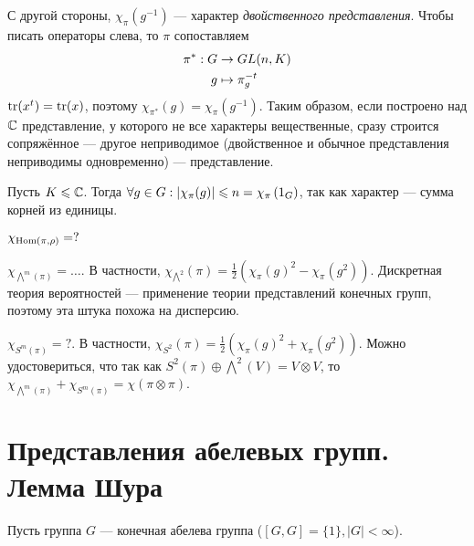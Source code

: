 {    С другой стороны, $\chi_{\pi}(g^{-1})$ --- характер \emph{двойственного представления}.
    Чтобы писать операторы слева, то $\pi$ сопоставляем
    \begin{align*}
        \pi^*: G &\rightarrow GL(n, K) \\ g & \mapsto \pi_g^{-t}
    \end{align*}
    $\operatorname{tr}(x^t) = \operatorname{tr}(x)$, поэтому $\chi_{\pi^*}(g) = \chi_\pi(g^{-1})$.
    Таким образом, если построено над $\mathbb{C}$ представление, у которого не все характеры вещественные, сразу строится сопряжённое --- другое неприводимое (двойственное и обычное представления неприводимы одновременно) --- представление.
    \item Пусть $K \leqslant \mathbb{C}$. Тогда $\forall g \in G: \left|\chi_\pi(g)\right| \leqslant n = \chi_\pi\left(1_G\right)$, так как характер --- сумма корней из единицы.
    \item $\chi_{\operatorname{Hom}(\pi,\rho)} = ?$
    \item $\chi_{\bigwedge^m(\pi)} = \dots$. В частности, $\chi_{\bigwedge^2}(\pi) = \frac12(\chi_\pi(g)^2 - \chi_{\pi}(g^2))$. Дискретная теория вероятностей --- применение теории представлений конечных групп, поэтому эта штука похожа на дисперсию.
    \item $\chi_{S^m(\pi)} = ?$. В частности, $\chi_{S^2}(\pi) = \frac12(\chi_\pi(g)^2 + \chi_{\pi}(g^2))$.
    Можно удостовериться, что так как $S^2(\pi) \oplus \bigwedge^2(V) = V \otimes V$, то $\chi_{\bigwedge^m(\pi)} + \chi_{S^m(\pi)} = \chi(\pi\otimes\pi)$.
}


\section{Представления абелевых групп. Лемма Шура}
Пусть группа $G$ --- конечная абелева группа ($[G, G] = \{1\}, |G| < \infty$).

